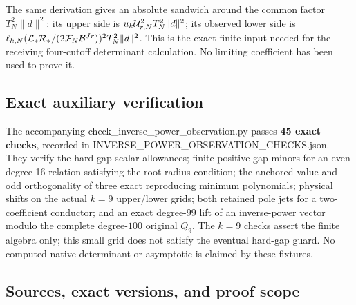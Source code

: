 The same derivation gives an absolute sandwich around the common factor \(T_N^2\|d\|^2\): its upper side is \(u_k{\cal U}_{r,N}^2T_N^2\|d\|^2\); its observed lower side is \(\ell_{k,N}({\cal L}_*{\cal R}_*/(2{\cal F}_N{\cal B}^{Jr}))^2T_N^2\|d\|^2\). This is the exact finite input needed for the receiving four-cutoff determinant calculation. No limiting coefficient has been used to prove it.

\subsection{Exact auxiliary verification}\label{exact-auxiliary-verification}

The accompanying check\_inverse\_power\_observation.py passes \textbf{45 exact checks}, recorded in INVERSE\_POWER\_OBSERVATION\_CHECKS.json. They verify the hard-gap scalar allowances; finite positive gap minors for an even degree-16 relation satisfying the root-radius condition; the anchored value and odd orthogonality of three exact reproducing minimum polynomials; physical shifts on the actual \(k=9\) upper/lower grids; both retained pole jets for a two-coefficient conductor; and an exact degree-\(99\) lift of an inverse-power vector modulo the complete degree-\(100\) original \(Q_9\). The \(k=9\) checks assert the finite algebra only; this small grid does not satisfy the eventual hard-gap guard. No computed native determinant or asymptotic is claimed by these fixtures.

\subsection{Sources, exact versions, and proof scope}\label{sources-exact-versions-and-proof-scope}


